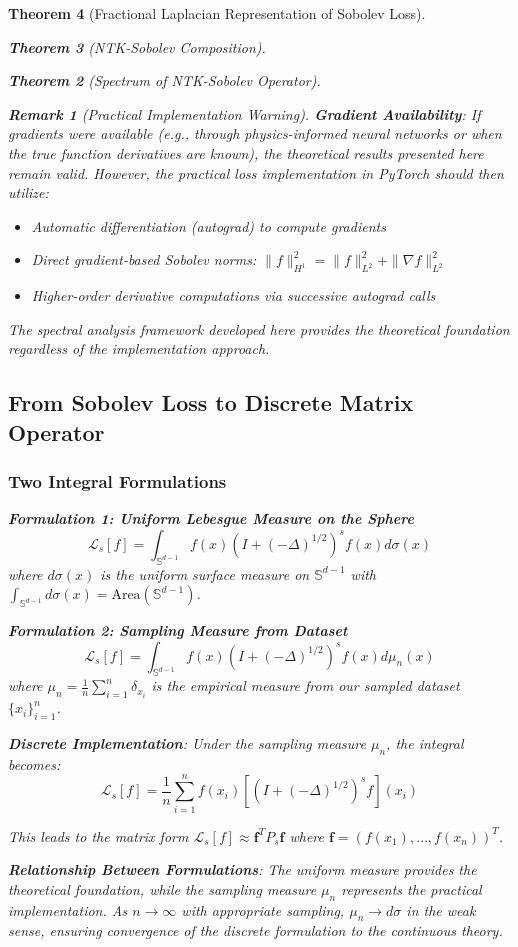 \documentclass{article}
\newtheorem{theorem}{Theorem}[section]
\newtheorem{remark}[theorem]{Remark}
\begin{document}
\begin{theorem}[Fractional Laplacian Representation of Sobolev Loss]
\begin{theorem}[NTK-Sobolev Composition]
\begin{theorem}[Spectrum of NTK-Sobolev Operator]
\begin{remark}[Practical Implementation Warning]
\textbf{Gradient Availability}: If gradients were available (e.g., through physics-informed neural networks or when the true function derivatives are known), the theoretical results presented here remain valid. However, the practical loss implementation in PyTorch should then utilize:
\begin{itemize}
\item Automatic differentiation (autograd) to compute gradients
\item Direct gradient-based Sobolev norms: $\|f\|_{H^1}^2 = \|f\|_{L^2}^2 + \|\nabla f\|_{L^2}^2$
\item Higher-order derivative computations via successive autograd calls
\end{itemize}

The spectral analysis framework developed here provides the theoretical foundation regardless of the implementation approach.
\end{remark}

\subsection{From Sobolev Loss to Discrete Matrix Operator}

\subsubsection{Two Integral Formulations}

\textbf{Formulation 1: Uniform Lebesgue Measure on the Sphere}
\[ \mathcal{L}_s[f] = \int_{\mathbb{S}^{d-1}} f(x) (I + (-\Delta)^{1/2})^s f(x) d\sigma(x) \]
where $d\sigma(x)$ is the uniform surface measure on $\mathbb{S}^{d-1}$ with $\int_{\mathbb{S}^{d-1}} d\sigma(x) = \text{Area}(\mathbb{S}^{d-1})$.

\textbf{Formulation 2: Sampling Measure from Dataset}
\[ \mathcal{L}_s[f] = \int_{\mathbb{S}^{d-1}} f(x) (I + (-\Delta)^{1/2})^s f(x) d\mu_n(x) \]
where $\mu_n = \frac{1}{n}\sum_{i=1}^n \delta_{x_i}$ is the empirical measure from our sampled dataset $\{x_i\}_{i=1}^n$.

\textbf{Discrete Implementation}:
Under the sampling measure $\mu_n$, the integral becomes:
\[ \mathcal{L}_s[f] = \frac{1}{n}\sum_{i=1}^n f(x_i) \left[(I + (-\Delta)^{1/2})^s f\right](x_i) \]

This leads to the matrix form $\mathcal{L}_s[f] \approx \mathbf{f}^T P_s \mathbf{f}$ where $\mathbf{f} = (f(x_1), \ldots, f(x_n))^T$.

\textbf{Relationship Between Formulations}:
The uniform measure provides the theoretical foundation, while the sampling measure $\mu_n$ represents the practical implementation. As $n \to \infty$ with appropriate sampling, $\mu_n \to d\sigma$ in the weak sense, ensuring convergence of the discrete formulation to the continuous theory.


\end{theorem}
\end{theorem}
\end{theorem}
\end{document}

